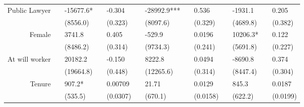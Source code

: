 \begin{tabular}{rrrrrrrrrrrrr}
Public Lawyer & \multicolumn{1}{l}{} & \multicolumn{1}{l}{-15677.6*} & \multicolumn{1}{l}{} & \multicolumn{1}{l}{-0.304} & \multicolumn{1}{l}{} & \multicolumn{1}{l}{-28992.9***} & \multicolumn{1}{l}{} & \multicolumn{1}{l}{0.536} & \multicolumn{1}{l}{} & \multicolumn{1}{l}{-1931.1} & \multicolumn{1}{l}{} & \multicolumn{1}{l}{0.205} \\
      & \multicolumn{1}{l}{} & \multicolumn{1}{l}{(8556.0)} & \multicolumn{1}{l}{} & \multicolumn{1}{l}{(0.323)} & \multicolumn{1}{l}{} & \multicolumn{1}{l}{(8097.6)} & \multicolumn{1}{l}{} & \multicolumn{1}{l}{(0.329)} & \multicolumn{1}{l}{} & \multicolumn{1}{l}{(4689.8)} & \multicolumn{1}{l}{} & \multicolumn{1}{l}{(0.382)} \\
Female & \multicolumn{1}{l}{} & \multicolumn{1}{l}{3741.8} & \multicolumn{1}{l}{} & \multicolumn{1}{l}{0.405} & \multicolumn{1}{l}{} & \multicolumn{1}{l}{-529.9} & \multicolumn{1}{l}{} & \multicolumn{1}{l}{0.0196} & \multicolumn{1}{l}{} & \multicolumn{1}{l}{10206.3*} & \multicolumn{1}{l}{} & \multicolumn{1}{l}{0.122} \\
      & \multicolumn{1}{l}{} & \multicolumn{1}{l}{(8486.2)} & \multicolumn{1}{l}{} & \multicolumn{1}{l}{(0.314)} & \multicolumn{1}{l}{} & \multicolumn{1}{l}{(9734.3)} & \multicolumn{1}{l}{} & \multicolumn{1}{l}{(0.241)} & \multicolumn{1}{l}{} & \multicolumn{1}{l}{(5691.8)} & \multicolumn{1}{l}{} & \multicolumn{1}{l}{(0.227)} \\
At will worker & \multicolumn{1}{l}{} & \multicolumn{1}{l}{20182.2} & \multicolumn{1}{l}{} & \multicolumn{1}{l}{-0.150} & \multicolumn{1}{l}{} & \multicolumn{1}{l}{8222.8} & \multicolumn{1}{l}{} & \multicolumn{1}{l}{0.0494} & \multicolumn{1}{l}{} & \multicolumn{1}{l}{-8690.8} & \multicolumn{1}{l}{} & \multicolumn{1}{l}{0.374} \\
      & \multicolumn{1}{l}{} & \multicolumn{1}{l}{(19664.8)} & \multicolumn{1}{l}{} & \multicolumn{1}{l}{(0.448)} & \multicolumn{1}{l}{} & \multicolumn{1}{l}{(12265.6)} & \multicolumn{1}{l}{} & \multicolumn{1}{l}{(0.314)} & \multicolumn{1}{l}{} & \multicolumn{1}{l}{(8447.4)} & \multicolumn{1}{l}{} & \multicolumn{1}{l}{(0.304)} \\
Tenure & \multicolumn{1}{l}{} & \multicolumn{1}{l}{907.2*} & \multicolumn{1}{l}{} & \multicolumn{1}{l}{0.00709} & \multicolumn{1}{l}{} & \multicolumn{1}{l}{21.71} & \multicolumn{1}{l}{} & \multicolumn{1}{l}{0.0129} & \multicolumn{1}{l}{} & \multicolumn{1}{l}{845.3} & \multicolumn{1}{l}{} & \multicolumn{1}{l}{0.0187} \\
      & \multicolumn{1}{l}{} & \multicolumn{1}{l}{(535.5)} & \multicolumn{1}{l}{} & \multicolumn{1}{l}{(0.0307)} & \multicolumn{1}{l}{} & \multicolumn{1}{l}{(670.1)} & \multicolumn{1}{l}{} & \multicolumn{1}{l}{(0.0158)} & \multicolumn{1}{l}{} & \multicolumn{1}{l}{(622.2)} & \multicolumn{1}{l}{} & \multicolumn{1}{l}{(0.0199)} \\

\end{tabular}
